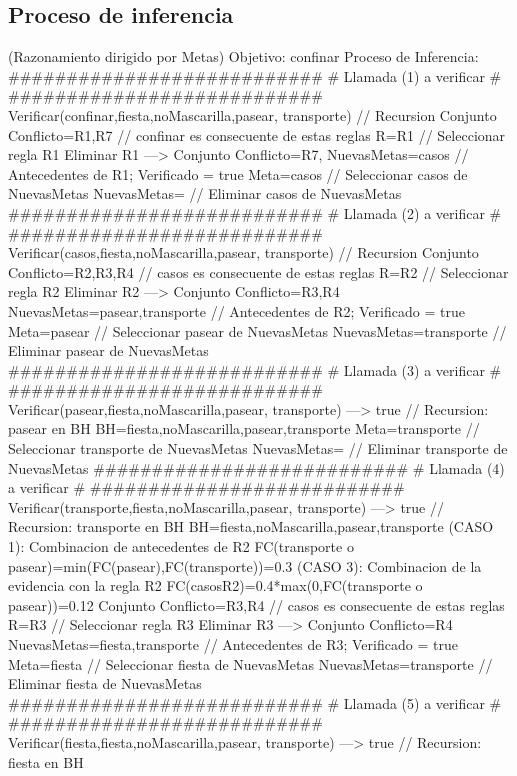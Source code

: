 \subsection{Proceso de inferencia}
\begin{listing}[language=Pascal]
(Razonamiento dirigido por Metas)
Objetivo: confinar
Proceso de Inferencia: 
  ###########################
  # Llamada (1) a verificar #
  ###########################
	Verificar(confinar,{fiesta,noMascarilla,pasear,
	transporte}) // Recursion 
	Conjunto Conflicto={R1,R7} // confinar es consecuente de estas reglas
	R={R1} // Seleccionar regla R1
	Eliminar R1 ---> Conjunto Conflicto={R7,}
	NuevasMetas={casos} // Antecedentes de R1; Verificado = true
	Meta=casos // Seleccionar casos de NuevasMetas
	NuevasMetas={} // Eliminar casos de NuevasMetas
  ###########################
  # Llamada (2) a verificar #
  ###########################
	Verificar(casos,{fiesta,noMascarilla,pasear,
	transporte}) // Recursion 
	Conjunto Conflicto={R2,R3,R4} // casos es consecuente de estas reglas
	R={R2} // Seleccionar regla R2
	Eliminar R2 ---> Conjunto Conflicto={R3,R4}
	NuevasMetas={pasear,transporte} // Antecedentes de R2; Verificado = true
	Meta=pasear // Seleccionar pasear de NuevasMetas
	NuevasMetas={transporte} // Eliminar pasear de NuevasMetas
  ###########################
  # Llamada (3) a verificar #
  ###########################
	Verificar(pasear,{fiesta,noMascarilla,pasear,
	transporte}) ---> true // Recursion: pasear en BH
	BH={fiesta,noMascarilla,pasear,transporte}
	Meta=transporte // Seleccionar transporte de NuevasMetas
	NuevasMetas={} // Eliminar transporte de NuevasMetas
  ###########################
  # Llamada (4) a verificar #
  ###########################
	Verificar(transporte,{fiesta,noMascarilla,pasear,
	transporte}) ---> true // Recursion: transporte en BH
	BH={fiesta,noMascarilla,pasear,transporte}
	(CASO 1): Combinacion de antecedentes de R2
	 FC(transporte o pasear)=min(FC(pasear),FC(transporte))=0.3
	(CASO 3): Combinacion de la evidencia con la regla R2
	 FC(casos{R2})=0.4*max(0,FC(transporte o pasear))=0.12
	Conjunto Conflicto={R3,R4} // casos es consecuente de estas reglas
	R={R3} // Seleccionar regla R3
	Eliminar R3 ---> Conjunto Conflicto={R4}
	NuevasMetas={fiesta,transporte} // Antecedentes de R3; Verificado = true
	Meta=fiesta // Seleccionar fiesta de NuevasMetas
	NuevasMetas={transporte} // Eliminar fiesta de NuevasMetas
  ###########################
  # Llamada (5) a verificar #
  ###########################
	Verificar(fiesta,{fiesta,noMascarilla,pasear,
	transporte}) ---> true // Recursion: fiesta en BH

\end{listing}
